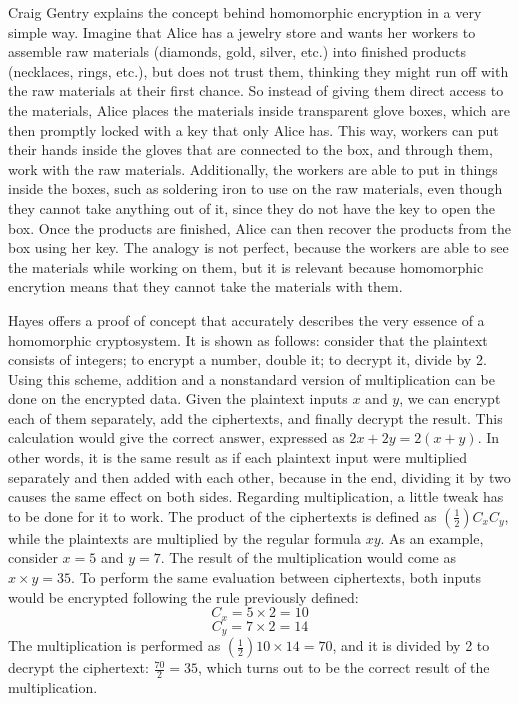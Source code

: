 Craig Gentry \cite{homoenc} explains the concept behind homomorphic encryption in a very simple way. Imagine that Alice has a jewelry store and wants her workers to assemble raw materials (diamonds, gold, silver, etc.) into finished products (necklaces, rings, etc.), but does not trust them, thinking they might run off with the raw materials at their first chance. So instead of giving them direct access to the materials, Alice places the materials inside transparent glove boxes, which are then promptly locked with a key that only Alice has. This way, workers can put their hands inside the gloves that are connected to the box, and through them, work with the raw materials. Additionally, the workers are able to put in things inside the boxes, such as soldering iron to use on the raw materials, even though they cannot take anything out of it, since they do not have the key to open the box. Once the products are finished, Alice can then recover the products from the box using her key. The analogy is not perfect, because the workers are able to see the materials while working on them, but it is relevant because homomorphic encrytion means that they cannot take the materials with them.

Hayes \cite{Hayes2012} offers a proof of concept that accurately describes the very essence of a homomorphic cryptosystem. It is shown as follows: consider that the plaintext consists of integers; to encrypt a number, double it; to decrypt it, divide by 2. Using this scheme, addition and a nonstandard version of multiplication can be done on the encrypted data. Given the plaintext inputs $x$ and $y$, we can encrypt each of them separately, add the ciphertexts, and finally decrypt the result. This calculation would give the correct answer, expressed as $2x+2y=2(x+y)$. In other words, it is the same result as if each plaintext input were multiplied separately and then added with each other, because in the end, dividing it by two causes the same effect on both sides. 
Regarding multiplication, a little tweak has to be done for it to work. The product of the ciphertexts is defined as $(\frac{1}{2}) C_x C_y$, while the plaintexts are multiplied by the regular formula $xy$. 
As an example, consider $x=5$ and $y=7$. The result of the multiplication would come as $x \times y = 35$. To perform the same evaluation between ciphertexts, both inputs would be encrypted following the rule previously defined:
\begin{equation}
C_{x} = 5 \times 2 = 10
\end{equation}
\begin{equation}
C_{y} = 7 \times 2 = 14
\end{equation}
The multiplication is performed as $(\frac{1}{2}) 10 \times 14 = 70$, and it is divided by 2 to decrypt the ciphertext: $\frac{70}{2} = 35$, which turns out to be the correct result of the multiplication.

